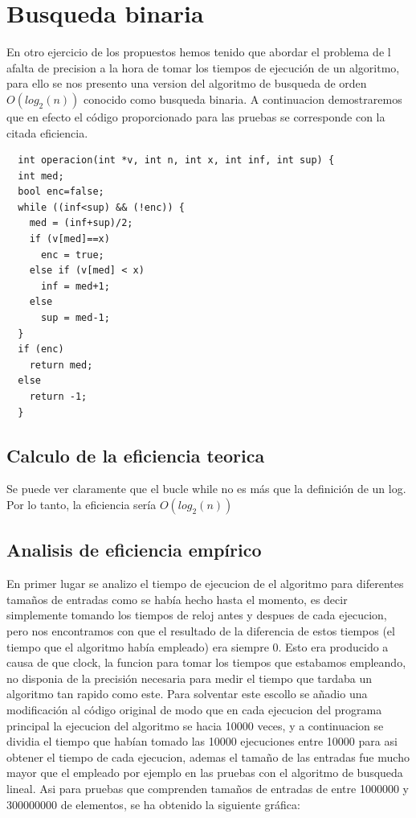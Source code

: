 \section{Busqueda binaria}
En otro ejercicio de los propuestos hemos tenido que abordar el problema de l afalta de precision a la hora de tomar los tiempos de ejecución de un algoritmo, para ello se nos presento una version del algoritmo de busqueda de orden $O(log_{2}(n))$ conocido como busqueda binaria. A continuacion demostraremos que en efecto el código proporcionado para las pruebas se corresponde con la citada eficiencia.

\begin{lstlisting}
  int operacion(int *v, int n, int x, int inf, int sup) {
  int med;
  bool enc=false;
  while ((inf<sup) && (!enc)) {
    med = (inf+sup)/2; 
    if (v[med]==x) 
      enc = true;
    else if (v[med] < x) 
      inf = med+1;
    else
      sup = med-1;
  }
  if (enc) 
    return med;
  else 
    return -1;
  }
\end{lstlisting}

\subsection{Calculo de la eficiencia teorica}

Se puede ver claramente que el bucle while no es más que la definición de un log. Por lo tanto, la eficiencia sería $O(log_{2}(n))$

\subsection{Analisis de eficiencia empírico}

En primer lugar se analizo el tiempo de ejecucion de el algoritmo para diferentes tamaños de entradas como se había hecho hasta el momento, es decir simplemente tomando los tiempos de reloj antes y despues de cada ejecucion, pero nos encontramos con que el resultado de la diferencia de estos tiempos (el tiempo que el algoritmo había empleado) era siempre 0. Esto era producido a causa de que clock, la funcion para tomar los tiempos que estabamos empleando, no disponia de la precisión necesaria para medir el tiempo que tardaba un algoritmo tan rapido como este. Para solventar este escollo se añadio una modificación al código original de modo que en cada ejecucion del programa principal la ejecucion del algoritmo se hacia 10000 veces, y a continuacion se dividia el tiempo que habían tomado las 10000 ejecuciones entre 10000 para asi obtener el tiempo de cada ejecucion, ademas el tamaño de las entradas fue mucho mayor que el empleado por ejemplo en las pruebas con el algoritmo de busqueda lineal. Asi para pruebas que comprenden tamaños de entradas de entre 1000000 y 300000000 de elementos, se ha obtenido la siguiente gráfica:

